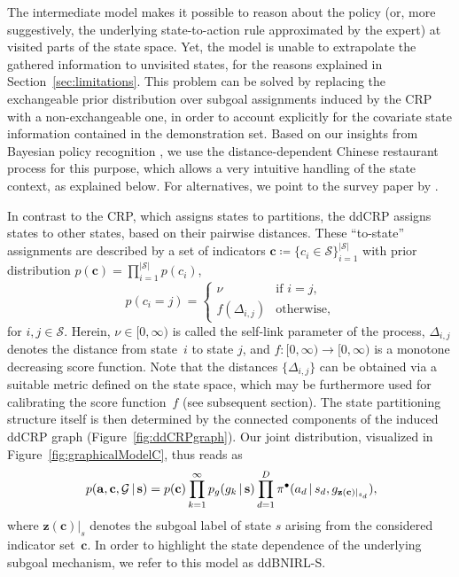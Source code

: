 \documentclass[twoside,11pt]{article}
\newcommand{\p}{p}
\newcommand{\given}{\,\vert\,}
\newcommand{\softmax}{{\pi}}
\newcommand{\defeq}{\coloneqq}
\newcommand{\eqkomma}{,}
\newcommand{\ddBNIRLS}{\mbox{ddBNIRL-S}}
\begin{document}
The intermediate model makes it possible to reason about the policy (or, more suggestively, the underlying state-to-action rule %
approximated by the expert) at visited %
parts of the state space. %
Yet, the model is unable to extrapolate %
%
the gathered information to unvisited states, for the reasons explained in Section~\ref{sec:limitations}.
%
%
%
%
%
%
This problem can be solved by replacing the exchangeable prior distribution over subgoal assignments induced by the CRP with a non-exchangeable one, %
%
in order to account explicitly for the covariate state information %
%
contained in the demonstration set.
Based on our insights from 
%
Bayesian policy recognition \citep[][]{sosic2018pami}, we use the distance-dependent Chinese restaurant process \citep[ddCRP,][]{blei2011distance} for this purpose, which allows a very intuitive handling of %
%
the state context, as explained below. %
%
For alternatives, %
we point to the survey paper by \cite{foti2015survey}.

In contrast to the CRP, which assigns states to partitions, the ddCRP assigns states to other states, based on their pairwise distances. 
These ``to-state'' assignments are described by a set of indicators $\mathbf{c}\defeq\{c_i\in\mathcal{S}\}_{i=1}^{|\mathcal{S}|}$ %
with prior distribution $\p(\mathbf{c})=\prod_{i=1}^{|\mathcal{S}|}\p(c_i)$,
\begin{equation}
	\p(c_i=j) = \begin{cases} \nu & \text{if } i=j\eqkomma \\ f(\Delta_{i,j}) &  \text{otherwise}\eqkomma \end{cases}
	\label{eq:ddCRPprior}
\end{equation}
for $i,j\in\mathcal{S}$. Herein, $\nu\in[0,\infty)$ is called the self-link parameter of the process, $\Delta_{i,j}$ denotes the distance from state~$i$ to state $j$, and $f:[0,\infty) \rightarrow [0, \infty)$ is a monotone decreasing score function. Note that the distances $\{\Delta_{i,j}\}$ can be obtained via a suitable metric defined on the state space, which may be furthermore used for calibrating the %
score function~$f$ (see subsequent section).
The state partitioning structure itself is then determined by the connected components of the induced ddCRP graph (Figure~\ref{fig:ddCRPgraph}). %
Our  joint distribution, visualized in Figure~\ref{fig:graphicalModelC}, thus reads as
\begin{equation}
\p(\mathbf{a},\mathbf{c},\mathcal{G} \given \mathbf{s}) = \p(\mathbf{c}) \prod_{k=1}^{\infty}\p_g(g_k \given \mathbf{s}) \prod_{d=1}^D \softmax^\bullet(a_d \given s_d, g_{\mathbf{z}(\mathbf{c})|_{s_d}}) \eqkomma \hspace{-0.5ex}
\label{eq:ddBNIRLSjoint}
\end{equation}
where $\mathbf{z}(\mathbf{c})|_s$ denotes the subgoal label of state $s$ arising from the considered indicator set~$\mathbf{c}$. %
In order to highlight the state dependence of the underlying subgoal mechanism, we refer to this model as \ddBNIRLS.
\end{document}
